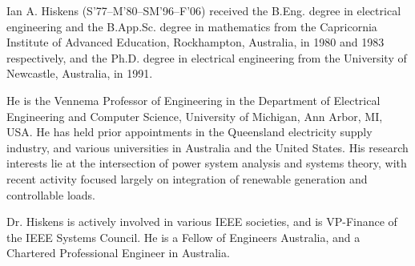 \documentclass[journal,twoside]{IEEEtran}
\begin{document}
\begin{IEEEbiography}{Ian A. Hiskens}
(S'77--M'80--SM'96--F'06) received the B.Eng. degree in electrical engineering and the B.App.Sc. degree in mathematics from the Capricornia Institute of Advanced Education, Rockhampton, Australia, in 1980 and 1983 respectively, and the Ph.D. degree in electrical engineering from the University of Newcastle, Australia, in 1991.

He is the Vennema Professor of Engineering
in the Department of Electrical Engineering and Computer Science, University of Michigan, Ann Arbor, MI, USA. He has held prior appointments in the Queensland electricity supply industry, and various universities in Australia and the United States. His research interests lie at the intersection of power system analysis and systems theory, with recent activity focused largely on integration of renewable generation and controllable loads.

Dr. Hiskens is actively involved in various IEEE societies, and is VP-Finance of the IEEE Systems Council. He is a Fellow of Engineers Australia, and a Chartered Professional Engineer in Australia.
\end{IEEEbiography}






\enlargethispage{-5in}



\end{document}
